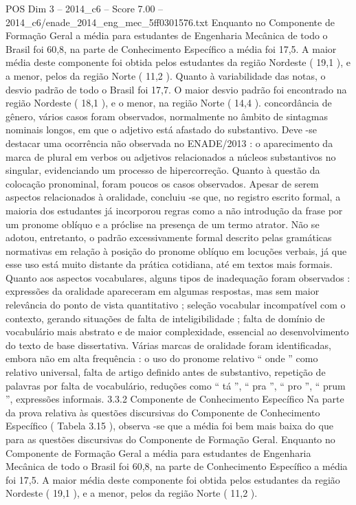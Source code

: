 \begin{textsample}{POS Dim 3 – 2014\_c6 – Score 7.00 – 2014\_c6/enade\_2014\_eng\_mec\_5ff0301576.txt}
Enquanto no Componente de Formação Geral a média para estudantes de Engenharia Mecânica de todo o Brasil foi 60,8, na parte de Conhecimento Específico a média foi 17,5.
A maior média deste componente foi obtida pelos estudantes da região Nordeste ( 19,1 ), e a menor, pelos da região Norte ( 11,2 ).
Quanto à variabilidade das notas, o desvio padrão de todo o Brasil foi 17,7.
O maior desvio padrão foi encontrado na região Nordeste ( 18,1 ), e o menor, na região Norte ( 14,4 ). concordância de gênero, vários casos foram observados, normalmente no âmbito de sintagmas nominais longos, em que o adjetivo está afastado do substantivo.
Deve -se destacar uma ocorrência não observada no ENADE/2013 : o aparecimento da marca de plural em verbos ou adjetivos relacionados a núcleos substantivos no singular, evidenciando um processo de hipercorreção.
Quanto à questão da colocação pronominal, foram poucos os casos observados.
Apesar de serem aspectos relacionados à oralidade, concluiu -se que, no registro escrito formal, a maioria dos estudantes já incorporou regras como a não introdução da frase por um pronome oblíquo e a próclise na presença de um termo atrator.
Não se adotou, entretanto, o padrão excessivamente formal descrito pelas gramáticas normativas em relação à posição do pronome oblíquo em locuções verbais, já que esse uso está muito distante da prática cotidiana, até em textos mais formais.
Quanto aos aspectos vocabulares, alguns tipos de inadequação foram observados : expressões da oralidade apareceram em algumas respostas, mas sem maior relevância do ponto de vista quantitativo ; seleção vocabular incompatível com o contexto, gerando situações de falta de inteligibilidade ; falta de domínio de vocabulário mais abstrato e de maior complexidade, essencial ao desenvolvimento do texto de base dissertativa.
Várias marcas de oralidade foram identificadas, embora não em alta frequência : o uso do pronome relativo “ onde ” como relativo universal, falta de artigo definido antes de substantivo, repetição de palavras por falta de vocabulário, reduções como “ tá ”, “ pra ”, “ pro ”, “ prum ”, expressões informais. 3.3.2 Componente de Conhecimento Específico Na parte da prova relativa às questões discursivas do Componente de Conhecimento Específico ( Tabela 3.15 ), observa -se que a média foi bem mais baixa do que para as questões discursivas do Componente de Formação Geral.
Enquanto no Componente de Formação Geral a média para estudantes de Engenharia Mecânica de todo o Brasil foi 60,8, na parte de Conhecimento Específico a média foi 17,5.
A maior média deste componente foi obtida pelos estudantes da região Nordeste ( 19,1 ), e a menor, pelos da região Norte ( 11,2 ).

\end{textsample}
